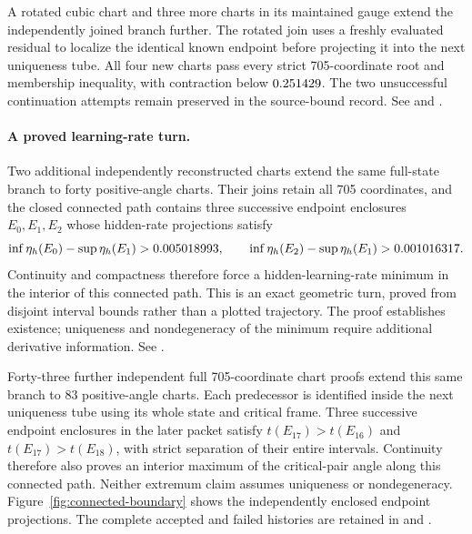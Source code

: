 \documentclass[11pt,letterpaper]{article}
\begin{document}
A rotated cubic chart and three more charts in its maintained gauge extend the
independently joined branch further.
The rotated join uses a freshly evaluated residual to localize the identical
known endpoint before projecting it into the next uniqueness tube. All four
new charts pass every strict 705-coordinate root and membership inequality,
with contraction below $0.251429$. The two unsuccessful
continuation attempts remain preserved in the source-bound record.
See  and
.

\paragraph{A proved learning-rate turn.}
Two additional independently reconstructed charts extend the same full-state
branch to forty positive-angle charts. Their joins retain all
705 coordinates, and the closed connected path contains three successive
endpoint enclosures $E_0,E_1,E_2$ whose hidden-rate projections satisfy
\begin{equation}
 \inf\eta_h(E_0)-\sup\eta_h(E_1)>0.005018993,\qquad
 \inf\eta_h(E_2)-\sup\eta_h(E_1)>0.001016317.
\end{equation}
Continuity and compactness therefore force a hidden-learning-rate minimum in
the interior of this connected path. This is an exact geometric turn, proved
from disjoint interval bounds rather than a plotted trajectory. The proof
establishes existence; uniqueness and nondegeneracy of the minimum require
additional derivative information. See
.

Forty-three further independent full 705-coordinate chart proofs extend this
same branch to 83 positive-angle charts. Each predecessor is
identified inside the next uniqueness tube using its whole state and critical
frame. Three successive endpoint enclosures in the later packet satisfy
$t(E_{17})>t(E_{16})$ and $t(E_{17})>t(E_{18})$, with strict separation of their
entire intervals. Continuity therefore also proves an interior maximum of the
critical-pair angle along this connected path. Neither extremum claim assumes
uniqueness or nondegeneracy. Figure~\ref{fig:connected-boundary} shows the
independently enclosed endpoint projections. The complete accepted and failed
histories are retained in
 and
.
\end{document}
